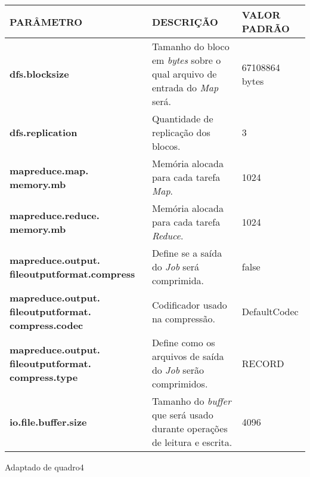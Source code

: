{\footnotesize
  \centering
  \begin{tabular}{|p{30mm}|p{50mm}|p{30mm}|}\hline
    \textbf{PARÂMETRO}                                          & \textbf{DESCRIÇÃO}                                                                       & \textbf{VALOR PADRÃO} \\\hline
    \textbf{dfs.blocksize}                                      & Tamanho do bloco em \textit{\gls{byte}s} sobre o qual arquivo de entrada do \textit{Map} será. & 67108864 \gls{byte}s        \\\hline
    \textbf{dfs.replication}                                    & Quantidade de replicação dos blocos.                                                     & 3                     \\\hline
    \textbf{mapreduce.map. memory.mb}                           & Memória alocada para cada tarefa \textit{Map}.                                           & 1024                  \\\hline
    \textbf{mapreduce.reduce. memory.mb}                           & Memória alocada para cada tarefa \textit{Reduce}.                                        & 1024                  \\\hline
    \textbf{mapreduce.output. fileoutputformat.compress}        & Define se a saída do \textit{Job} será comprimida.                                       & false                 \\\hline
    \textbf{mapreduce.output. fileoutputformat. compress.codec} & Codificador usado na compressão.                                                         & DefaultCodec          \\\hline
    \textbf{mapreduce.output. fileoutputformat. compress.type}  & Define como os arquivos de saída do \textit{Job} serão comprimidos.                      & RECORD                \\\hline
    \textbf{io.file.buffer.size}                                & Tamanho do \textit{buffer} que será usado durante operações de leitura e escrita.        & 4096                  \\\hline
  \end{tabular}}
{Adaptado de \cite{HadoopDocs321}}{quadro4}{}{}


